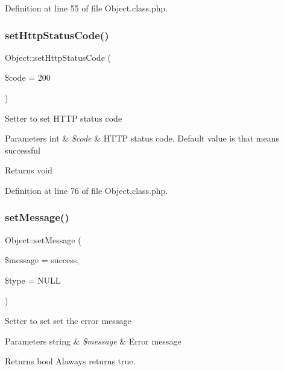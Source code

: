Definition at line 55 of file Object.\+class.\+php.

\hypertarget{classObject_a876fabaa6dba9f8bcc53ef04eb7f3784}{}\label{classObject_a876fabaa6dba9f8bcc53ef04eb7f3784} 
\subsubsection{\texorpdfstring{set\+Http\+Status\+Code()}{setHttpStatusCode()}}
{\footnotesize\ttfamily Object\+::set\+Http\+Status\+Code (\begin{DoxyParamCaption}\item[{}]{\$code = {\ttfamily \textquotesingle{}200\textquotesingle{}} }\end{DoxyParamCaption})}

Setter to set H\+T\+TP status code


\begin{DoxyParams}[1]{Parameters}
int & {\em \$code} & H\+T\+TP status code. Default value is {} that means successful \\
\hline
\end{DoxyParams}
\begin{DoxyReturn}{Returns}
void 
\end{DoxyReturn}


Definition at line 76 of file Object.\+class.\+php.

\hypertarget{classObject_aecb43fbc87ff3edfda11eb5d8abc814e}{}\label{classObject_aecb43fbc87ff3edfda11eb5d8abc814e} 
\subsubsection{\texorpdfstring{set\+Message()}{setMessage()}}
{\footnotesize\ttfamily Object\+::set\+Message (\begin{DoxyParamCaption}\item[{}]{\$message = {\ttfamily \textquotesingle{}success\textquotesingle{}},  }\item[{}]{\$type = {\ttfamily NULL} }\end{DoxyParamCaption})}

Setter to set set the error message


\begin{DoxyParams}[1]{Parameters}
string & {\em \$message} & Error message \\
\hline
\end{DoxyParams}
\begin{DoxyReturn}{Returns}
bool Alaways returns true. 
\end{DoxyReturn}


